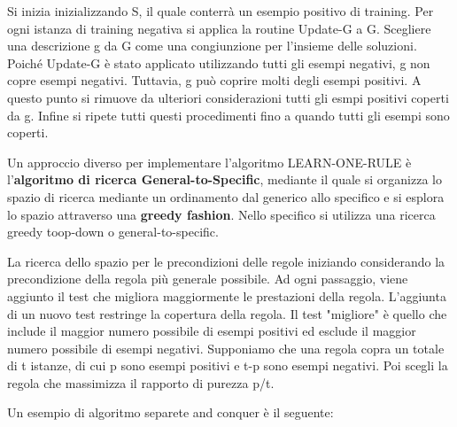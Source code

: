 \documentclass[a4paper]{extarticle}
\begin{document}
Si inizia inizializzando S, il quale conterrà un esempio positivo di training. Per ogni istanza di training negativa si applica la routine Update-G a G. Scegliere una descrizione g da G come una congiunzione per l'insieme delle soluzioni. Poiché Update-G è stato applicato utilizzando tutti gli esempi negativi, g non copre esempi negativi. Tuttavia, g può coprire molti degli esempi positivi. A questo punto si rimuove da ulteriori considerazioni tutti gli esmpi positivi coperti da g. Infine si ripete tutti questi procedimenti fino a quando tutti gli esempi sono coperti.

Un approccio diverso per implementare l'algoritmo LEARN-ONE-RULE è l'\textbf{algoritmo di ricerca General-to-Specific}, mediante il quale si organizza lo spazio di ricerca mediante un ordinamento dal generico allo specifico e si esplora lo spazio attraverso una \textbf{greedy fashion}. Nello specifico si utilizza una ricerca greedy toop-down o general-to-specific. 

La ricerca dello spazio per le precondizioni delle regole iniziando considerando la precondizione della regola più generale possibile. Ad ogni passaggio, viene aggiunto il test che migliora maggiormente le prestazioni della regola. L'aggiunta di un nuovo test restringe la copertura della regola. Il test "migliore" è quello che include il maggior numero possibile di esempi positivi ed esclude il maggior numero possibile di esempi negativi. Supponiamo che una regola copra un totale di t istanze, di cui p sono esempi positivi e t-p sono esempi negativi. Poi scegli la regola che massimizza il rapporto di purezza p/t.

Un esempio di algoritmo separete and conquer è il seguente:

\begin{center}


\end{center}
\end{document}
